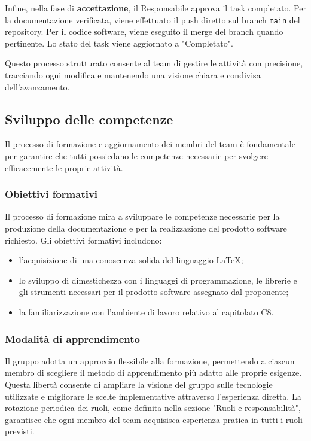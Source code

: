 \documentclass[a4paper, 11pt, oneside]{scrartcl} %
\begin{document}
Infine, nella fase di \textbf{accettazione}, il Responsabile approva il task completato. Per la documentazione verificata, viene effettuato il push diretto sul branch \texttt{main} del repository. Per il codice software, viene eseguito il merge del branch quando pertinente. Lo stato del task viene aggiornato a "Completato".

Questo processo strutturato consente al team di gestire le attività con precisione, tracciando ogni modifica e mantenendo una visione chiara e condivisa dell'avanzamento.

\subsection{Sviluppo delle competenze}
Il processo di formazione e aggiornamento dei membri del team è fondamentale per garantire che tutti possiedano le competenze necessarie per svolgere efficacemente le proprie attività.

\subsubsection{Obiettivi formativi}
Il processo di formazione mira a sviluppare le competenze necessarie per la produzione della documentazione e per la realizzazione del prodotto software richiesto.
Gli obiettivi formativi includono:
\begin{itemize}
    \item l'acquisizione di una conoscenza solida del linguaggio \LaTeX{};
    \item lo sviluppo di dimestichezza con i linguaggi di programmazione, le librerie e gli strumenti necessari per il prodotto software assegnato dal proponente;
    \item la familiarizzazione con l'ambiente di lavoro relativo al capitolato C8.
\end{itemize}

\subsubsection{Modalità di apprendimento}
Il gruppo adotta un approccio flessibile alla formazione, permettendo a ciascun membro di scegliere il metodo di apprendimento più adatto alle proprie esigenze.
Questa libertà consente di ampliare la visione del gruppo sulle tecnologie utilizzate e migliorare le scelte implementative attraverso l'esperienza diretta.
La rotazione periodica dei ruoli, come definita nella sezione "Ruoli e responsabilità", garantisce che ogni membro del team acquisisca esperienza pratica in tutti i ruoli previsti.
\end{document}
